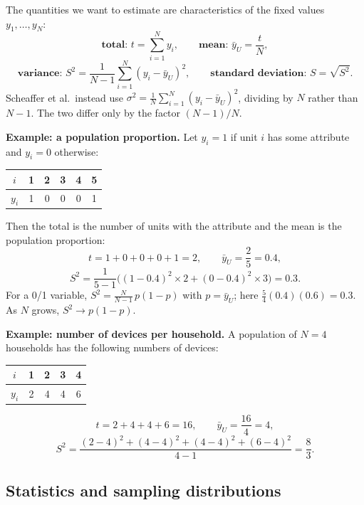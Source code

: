 \documentclass[
  letterpaper,
  DIV=11,
  numbers=noendperiod]{scrreprt}
\newcounter{none} %
\renewcommand{\[}{\begin{equation}}
\renewcommand{\]}{\end{equation}}
\begin{document}
The quantities we want to estimate are characteristics of the fixed
values \(y_1, \ldots, y_N\): \[
\textbf{total: } t = \sum_{i=1}^N y_i, \qquad
\textbf{mean: } \bar y_{U} = \frac{t}{N},
\] \[
\textbf{variance: } S^2 = \frac{1}{N-1}\sum_{i=1}^N (y_i-\bar y_{U})^2, \qquad
\textbf{standard deviation: } S = \sqrt{S^2}.
\] Scheaffer et al.~instead use
\(\sigma^2 = \frac1N \sum_{i=1}^N (y_i - \bar y_{U})^2\), dividing by
\(N\) rather than \(N-1\). The two differ only by the factor
\((N-1)/N\).

\textbf{Example: a population proportion.} Let \(y_i = 1\) if unit \(i\)
has some attribute and \(y_i = 0\) otherwise:

{\def\LTcaptype{none} %
\begin{longtable}[]{@{}cccccc@{}}
\toprule\noalign{}
\(i\) & 1 & 2 & 3 & 4 & 5 \\
\midrule\noalign{}
\endhead
\bottomrule\noalign{}
\endlastfoot
\(y_i\) & 1 & 0 & 0 & 0 & 1 \\
\end{longtable}
}

Then the total is the number of units with the attribute and the mean is
the population proportion: \[
t = 1+0+0+0+1 = 2, \qquad
\bar y_{U} = \frac{2}{5} = 0.4,
\] \[
S^2 = \frac{1}{5-1}\Big((1-0.4)^2\times 2 + (0-0.4)^2\times 3\Big) = 0.3 .
\] For a 0/1 variable, \(S^2 = \frac{N}{N-1}\,p(1-p)\) with
\(p = \bar y_U\); here \(\frac54(0.4)(0.6) = 0.3\). As \(N\) grows,
\(S^2 \to p(1-p)\).

\textbf{Example: number of devices per household.} A population of
\(N = 4\) households has the following numbers of devices:

{\def\LTcaptype{none} %
\begin{longtable}[]{@{}ccccc@{}}
\toprule\noalign{}
\(i\) & 1 & 2 & 3 & 4 \\
\midrule\noalign{}
\endhead
\bottomrule\noalign{}
\endlastfoot
\(y_i\) & 2 & 4 & 4 & 6 \\
\end{longtable}
}

\[
t = 2+4+4+6 = 16, \qquad
\bar y_{U} = \frac{16}{4} = 4,
\] \[
S^2 = \frac{(2-4)^2+(4-4)^2+(4-4)^2+(6-4)^2}{4-1} = \frac{8}{3}.
\]

\subsection{Statistics and sampling
distributions}\label{statistics-and-sampling-distributions}
\end{document}
